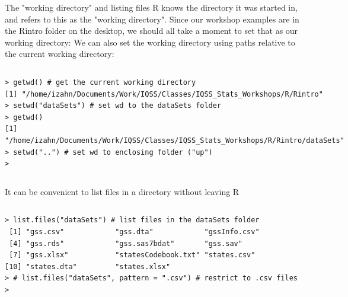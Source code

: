 \documentclass[table,smaller]{beamer}
\begin{document}
\begin{frame}[fragile,label=sec-5-2]{The "working directory" and listing files}
  R knows the directory it was started in, and refers to this as the "working directory". Since our workshop examples are in the Rintro folder on the desktop, we should all take a moment to set that as our working directory:
We can also set the working directory using paths relative to the current working directory:

\vspace{-.5em}
\begin{columns}
\begin{block}{}
\begin{verbatim}
> getwd() # get the current working directory
[1] "/home/izahn/Documents/Work/IQSS/Classes/IQSS_Stats_Workshops/R/Rintro"
> setwd("dataSets") # set wd to the dataSets folder
> getwd()
[1] "/home/izahn/Documents/Work/IQSS/Classes/IQSS_Stats_Workshops/R/Rintro/dataSets"
> setwd("..") # set wd to enclosing folder ("up")
>
\end{verbatim}
\end{block}
\end{columns}
\vspace{.5em}

It can be convenient to list files in a directory without leaving R
\vspace{-.5em}
\begin{columns}
\begin{block}{}
\begin{verbatim}
> list.files("dataSets") # list files in the dataSets folder
 [1] "gss.csv"            "gss.dta"            "gssInfo.csv"       
 [4] "gss.rds"            "gss.sas7bdat"       "gss.sav"           
 [7] "gss.xlsx"           "statesCodebook.txt" "states.csv"        
[10] "states.dta"         "states.xlsx"       
> # list.files("dataSets", pattern = ".csv") # restrict to .csv files  
>
\end{verbatim}
\end{block}
\end{columns}
\vspace{.5em}
\end{frame}
\end{document}
